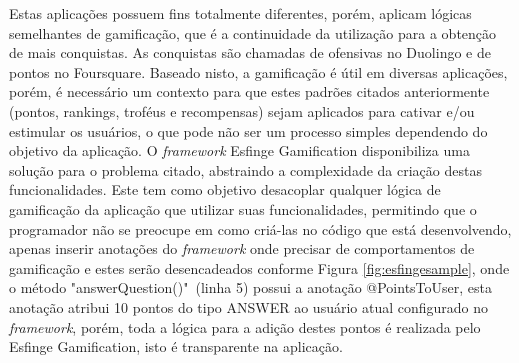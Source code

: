 
\par Estas aplicações possuem fins totalmente diferentes, porém, aplicam lógicas semelhantes de gamificação, que é a continuidade da utilização para a obtenção de mais conquistas. As conquistas são chamadas de ofensivas no Duolingo e de pontos no Foursquare. Baseado nisto, a gamificação é útil em diversas aplicações, porém, é necessário um contexto para que estes padrões citados anteriormente (pontos, rankings, troféus e recompensas) sejam aplicados para cativar e/ou estimular os usuários, o que pode não ser um processo simples dependendo do objetivo da aplicação. O \textit{framework} Esfinge Gamification disponibiliza uma solução para o problema citado, abstraindo a complexidade da criação destas funcionalidades. Este tem como objetivo desacoplar qualquer lógica de gamificação da aplicação que utilizar suas funcionalidades, permitindo que o programador não se preocupe em como criá-las no código que está desenvolvendo, apenas inserir anotações do \textit{framework} onde precisar de comportamentos de gamificação  e estes serão desencadeados conforme Figura \ref{fig:esfingesample}, onde o método "answerQuestion()"\ (linha 5) possui a anotação @PointsToUser, esta anotação atribui 10 pontos do tipo ANSWER ao usuário atual configurado no \textit{framework}, porém, toda a lógica para a adição destes pontos é realizada pelo Esfinge Gamification, isto é transparente na aplicação.

